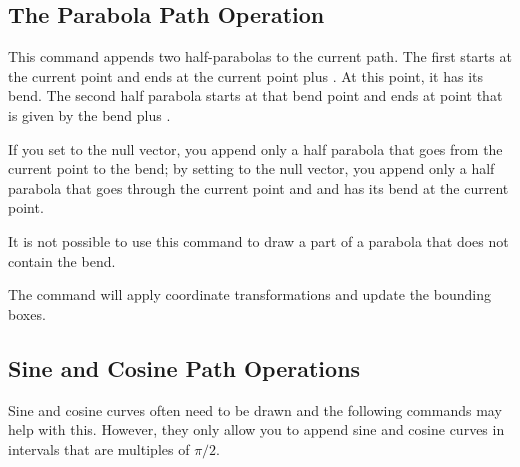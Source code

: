 \subsection{The Parabola Path Operation}

\begin{command}{\pgfpathparabola{}}
    This command appends two half-parabolas to the current path. The first
    starts at the current point and ends at the current point plus . At this point, it has its bend. The second half parabola starts at
    that bend point and ends at point that is given by the bend plus .

    If you set  to the null vector, you append only a half
    parabola that goes from the current point to the bend; by setting
     to the null vector, you append only a half parabola that
    goes through the current point and  and has its bend at
    the current point.

    It is not possible to use this command to draw a part of a parabola that
    does not contain the bend.
\begin{codeexample}[]
\begin{pgfpicture}
  \pgfpathmoveto{\pgfpointorigin}
  \pgfpathparabola{\pgfpointorigin}{\pgfpoint{2cm}{4cm}}
  \color{red}

  \pgfpathmoveto{\pgfpointorigin}
  \pgfpathparabola{\pgfpoint{-2cm}{4cm}}{\pgfpointorigin}
  \color{blue}

  \pgfpathmoveto{\pgfpoint{-2cm}{2cm}}
  \pgfpathparabola{\pgfpoint{1cm}{-1cm}}{\pgfpoint{2cm}{4cm}}
  \color{orange}
\end{pgfpicture}
\end{codeexample}
    The command will apply coordinate transformations and update the bounding
    boxes.
\end{command}


\subsection{Sine and Cosine Path Operations}

Sine and cosine curves often need to be drawn and the following commands may
help with this. However, they only allow you to append sine and cosine curves
in intervals that are multiples of $\pi/2$.

